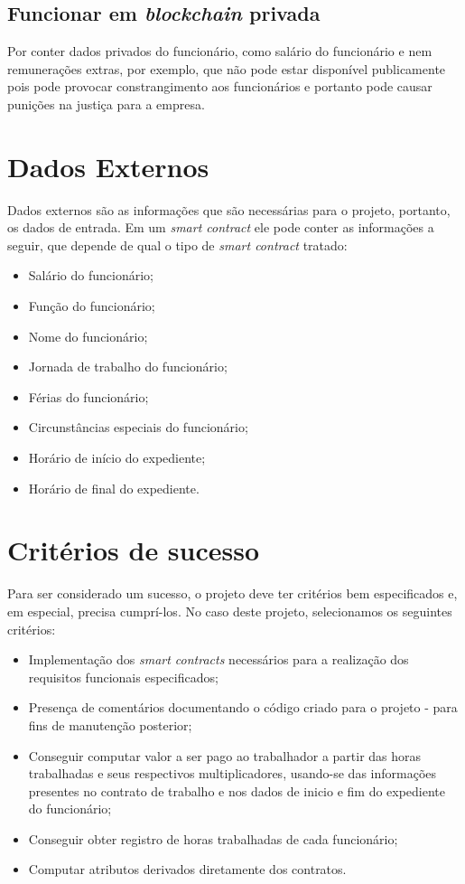 \documentclass{article}
\begin{document}
\subsection{Funcionar em \textit{blockchain} privada}
Por conter dados privados do funcionário, como salário do funcionário e nem
remunerações extras, por exemplo, que não pode estar disponível publicamente
pois pode provocar constrangimento aos funcionários e portanto pode causar
punições na justiça para a empresa.

\section{Dados Externos}
Dados externos são as informações que são necessárias para o projeto, portanto,
os dados de entrada. Em um \textit{smart contract} ele pode conter as
informações a seguir, que depende de qual o tipo de \textit{smart contract}
tratado:
\begin{itemize}
    \item Salário do funcionário;
    \item Função do funcionário;
    \item Nome do funcionário;
    \item Jornada de trabalho do funcionário;
    \item Férias do funcionário;
    \item Circunstâncias especiais do funcionário;
    \item Horário de início do expediente;
    \item Horário de final do expediente.
\end{itemize}

\section{Critérios de sucesso}
Para ser considerado um sucesso, o projeto deve ter critérios bem especificados
e, em especial, precisa cumprí-los. No caso deste projeto, selecionamos os
seguintes critérios:

\begin{itemize}
    \item Implementação dos \textit{smart contracts} necessários para a
        realização dos requisitos funcionais especificados;
    \item Presença de comentários documentando o código criado para o projeto -
        para fins de manutenção posterior;
    \item Conseguir computar valor a ser pago ao trabalhador a partir das horas
        trabalhadas e seus respectivos multiplicadores, usando-se das
        informações presentes no contrato de trabalho e nos dados de inicio e
        fim do expediente do funcionário;
    \item Conseguir obter registro de horas trabalhadas de cada funcionário;
    \item Computar atributos derivados diretamente dos contratos.
\end{itemize}
\end{document}
